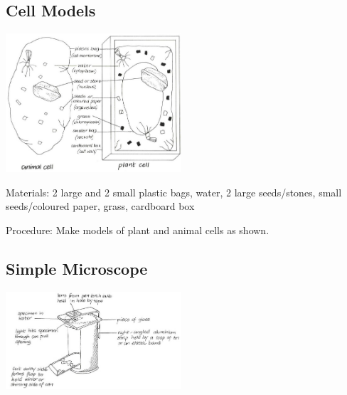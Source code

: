 \begin{multicols}{2}
\subsection{Cell Models}

\begin{center}
\includegraphics[width=0.49\textwidth]{./img/vso/cell-models.jpg}
\end{center}

\begin{description*}
\item[Materials:]{2 large and 2 small plastic bags, water, 2 large seeds/stones, small seeds/coloured paper, grass, cardboard box}
\item[Procedure:]{Make models of plant and animal cells as shown.}
\end{description*}

\subsection{Simple Microscope} %

\begin{center}
\includegraphics[width=0.49\textwidth]{./img/vso/microscope.jpg}
\end{center}


\end{multicols}
